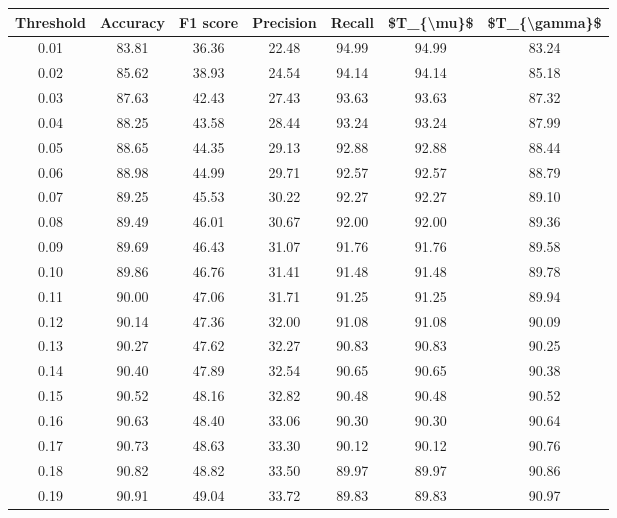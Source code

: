 \begin{tabular}{|c|c|c|c|c|c|c|}
\hline
 Threshold &  Accuracy &  F1 score &  Precision &  Recall &  \$T\_\{\textbackslash mu\}\$ &  \$T\_\{\textbackslash gamma\}\$ \\
\hline
      0.01 &     83.81 &     36.36 &      22.48 &   94.99 &      94.99 &         83.24 \\
      0.02 &     85.62 &     38.93 &      24.54 &   94.14 &      94.14 &         85.18 \\
      0.03 &     87.63 &     42.43 &      27.43 &   93.63 &      93.63 &         87.32 \\
      0.04 &     88.25 &     43.58 &      28.44 &   93.24 &      93.24 &         87.99 \\
      0.05 &     88.65 &     44.35 &      29.13 &   92.88 &      92.88 &         88.44 \\
      0.06 &     88.98 &     44.99 &      29.71 &   92.57 &      92.57 &         88.79 \\
      0.07 &     89.25 &     45.53 &      30.22 &   92.27 &      92.27 &         89.10 \\
      0.08 &     89.49 &     46.01 &      30.67 &   92.00 &      92.00 &         89.36 \\
      0.09 &     89.69 &     46.43 &      31.07 &   91.76 &      91.76 &         89.58 \\
      0.10 &     89.86 &     46.76 &      31.41 &   91.48 &      91.48 &         89.78 \\
      0.11 &     90.00 &     47.06 &      31.71 &   91.25 &      91.25 &         89.94 \\
      0.12 &     90.14 &     47.36 &      32.00 &   91.08 &      91.08 &         90.09 \\
      0.13 &     90.27 &     47.62 &      32.27 &   90.83 &      90.83 &         90.25 \\
      0.14 &     90.40 &     47.89 &      32.54 &   90.65 &      90.65 &         90.38 \\
      0.15 &     90.52 &     48.16 &      32.82 &   90.48 &      90.48 &         90.52 \\
      0.16 &     90.63 &     48.40 &      33.06 &   90.30 &      90.30 &         90.64 \\
      0.17 &     90.73 &     48.63 &      33.30 &   90.12 &      90.12 &         90.76 \\
      0.18 &     90.82 &     48.82 &      33.50 &   89.97 &      89.97 &         90.86 \\
      0.19 &     90.91 &     49.04 &      33.72 &   89.83 &      89.83 &         90.97 \\

\end{tabular}
